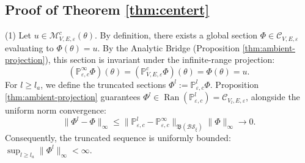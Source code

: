 \documentclass[reqno,11pt]{amsart}
\begin{document}
\subsection*{Proof of Theorem \ref{thm:centert}}
(1)  Let $u \in \mathcal{M}_{V,E,\varepsilon}^c(\theta)$. By definition, there exists a global section $\Phi \in \mathcal{C}_{V,E,\varepsilon}$ evaluating to $\Phi(\theta) = u$. By the Analytic Bridge (Proposition \ref{thm:ambient-projection}), this section is  invariant under the infinite-range projection: $$ 
(\mathbb{ P }_{\varepsilon,c}^{\infty}\Phi)(\theta)= (\mathbb P_{V,E,\varepsilon}^c\Phi)(\theta)=\Phi(\theta)=u.
$$ For $l \ge l_a$, we define the truncated sections $\Phi^l := \mathbb{P}_{\varepsilon,c}^l\Phi$. Proposition \ref{thm:ambient-projection} guarantees $\Phi^l \in \operatorname{Ran}(\mathbb{P}_{\varepsilon,c}^l) = \mathcal{C}_{V_l,E,\varepsilon}$, alongside the uniform norm convergence:
\begin{equation}\label{phicon}
    \|\Phi^l - \Phi\|_\infty \le \|\mathbb{P}_{\varepsilon,c}^l - \mathbb{P}_{\varepsilon,c}^\infty\|_{\mathfrak{B}( \mathcal{BS}_\xi)} \|\Phi\|_\infty \to 0.
\end{equation}
Consequently, the truncated sequence is uniformly bounded: $\sup_{l \ge l_a} \|\Phi^l\|_\infty < \infty$.
\end{document}
